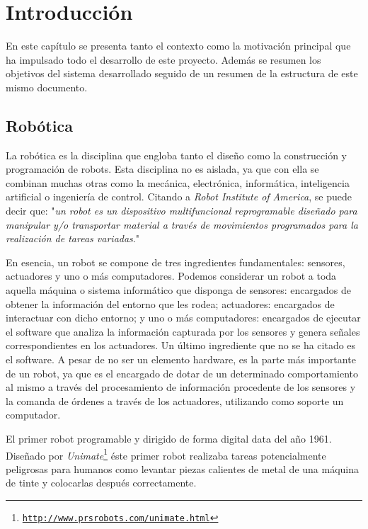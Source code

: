 \chapter{Introducción}

En este capítulo se presenta tanto el contexto como la motivación principal que ha impulsado todo el desarrollo de este proyecto. Además se resumen los objetivos del sistema desarrollado seguido de un resumen de la estructura de este mismo documento.

\section{Robótica}
\label{sec:robotica}

La robótica es la disciplina que engloba tanto el diseño como la  construcción y programación de robots. Esta disciplina no es aislada, ya que con ella se combinan muchas otras como la mecánica, electrónica, informática, inteligencia artificial o ingeniería de control. Citando a \textit{Robot Institute of America}, se puede decir que: "\textit{un robot es un dispositivo multifuncional reprogramable diseñado para manipular y/o transportar material a través de movimientos programados para la realización de tareas variadas}."

En esencia, un robot se compone de tres ingredientes fundamentales: sensores, actuadores y uno o más computadores. Podemos considerar un robot a toda aquella máquina o sistema informático que disponga de sensores: encargados de obtener la información del entorno que les rodea; actuadores: encargados de interactuar con dicho entorno; y uno o más computadores: encargados de ejecutar el software que analiza la información capturada por los sensores y genera señales correspondientes en los actuadores. Un último ingrediente que no se ha citado es el software. A pesar de no ser un elemento hardware, es la parte más importante de un robot, ya que es el encargado de dotar de un determinado comportamiento al mismo a través del procesamiento de información procedente de los sensores y la comanda de órdenes a través de los actuadores, utilizando como soporte un computador.

El primer robot programable y dirigido de forma digital data del año 1961. Diseñado por \textit{Unimate}\footnote{\href{http://www.prsrobots.com/unimate.html}{\texttt{http://www.prsrobots.com/unimate.html}}} éste primer robot realizaba tareas potencialmente peligrosas para humanos como levantar piezas calientes de metal de una máquina de tinte y colocarlas después correctamente.

